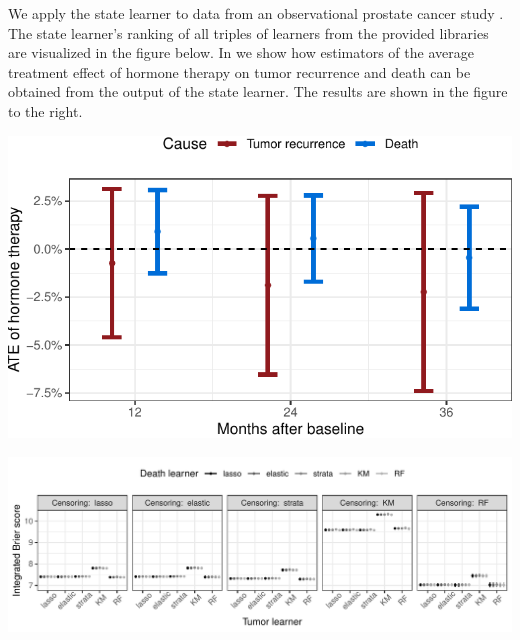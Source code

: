 \documentclass[a0,portrait]{a0poster}
\newcommand{\1}{\mathds{1}}
\begin{document}
\begin{minipage}{\textwidth}
\begin{minipage}[t]{1\linewidth}
\begin{multicols}{2}
\begin{multicols}{2}
  We apply the state learner to data from an observational prostate
  cancer study \cite{kattan2000pretreatment}. The state learner's ranking of all
  triples of learners from the provided libraries are visualized in the figure
  below. In \cite{munch2024} we show how estimators of the average treatment
  effect of hormone therapy on tumor recurrence and death can be obtained from
  the output of the state learner. The results are shown in the figure to the
  right. \vfill\null \columnbreak
\begin{center}
  \includegraphics[width=1\linewidth]{zelefsky-data-target-par.pdf}
\end{center}
  
\end{multicols}


\begin{center}
  \includegraphics[width=1\linewidth]{zelefski-real-data.pdf}
\end{center}



\end{multicols}
\end{minipage}
\end{minipage}
\end{document}
